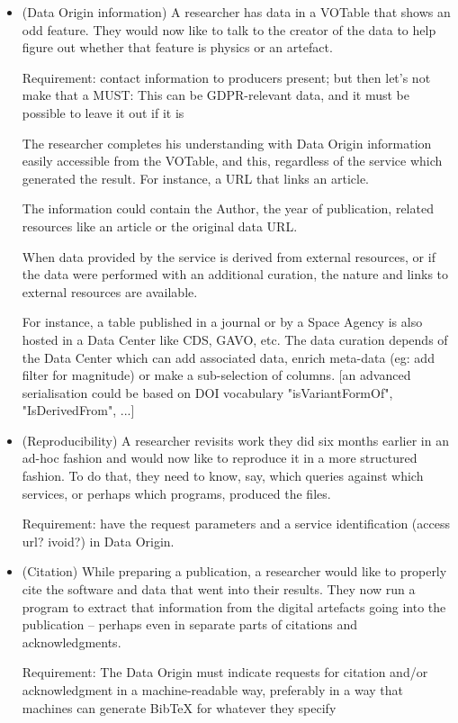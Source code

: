 \documentclass[11pt,a4paper]{ivoa}
\begin{document}
\begin{itemize}
	\item (Data Origin information) A researcher has data in a VOTable that shows an odd feature. They would now like to talk to the creator of the data to help figure out whether that feature is physics or an artefact. 
	
	Requirement: contact information to producers present; but then let's not make that a MUST: This can be GDPR-relevant data, and it must be possible to leave it out if it is
	
	The researcher completes his understanding with Data Origin information easily accessible from the VOTable, and this, regardless of the service which generated the result. For instance, a URL that links an article. 
	
	The information could contain the Author, the year of publication, related resources like an article or the original data URL.
	
	When data provided by the service is derived from external resources, or if the data were performed with an additional curation, the nature and links to external resources are available.
	
	For instance, a table published in a journal or by a Space Agency is also hosted in a Data Center like CDS, GAVO, etc. The data curation depends of the Data Center which can add associated data, enrich meta-data (eg: add filter for magnitude) or make a sub-selection of columns. [an advanced serialisation could be based on DOI vocabulary "isVariantFormOf", "IsDerivedFrom", ...]
	
	\item (Reproducibility) A researcher revisits work they did six months earlier in an ad-hoc fashion and would now like to reproduce it in a more structured fashion. To do that, they need to know, say, which queries against which services, or perhaps which programs, produced the files. 
	
	Requirement: have the request parameters and a service identification (access url? ivoid?) in Data Origin.
	
	\item (Citation) While preparing a publication, a researcher would like to properly cite the software and data that went into their results. They now run a program to extract that information from the digital artefacts going into the publication -- perhaps even in separate parts of citations and acknowledgments. 
	
	Requirement: The Data Origin must indicate requests for citation and/or acknowledgment in a machine-readable way, preferably in a way that machines can generate BibTeX for whatever they specify
	

\end{itemize}
\end{document}
